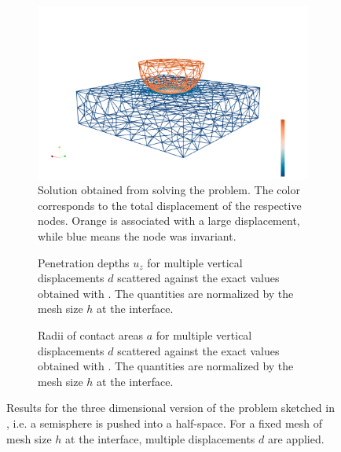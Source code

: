 \documentclass[11pt, a4paper]{article}
\begin{document}
\begin{figure}[H]
\begin{subfigure}[t]{\textwidth}
\centering
    \includegraphics[scale=0.4, trim={5cm 3cm 6cm 3cm},clip]{figures/mesh3d.png}
    \caption{Solution obtained from solving the problem. The color corresponds to the total displacement of the respective nodes. Orange is associated with a large displacement, while blue means the node was invariant.}
    \label{fig:contact3d-plane-sphere}
\end{subfigure}
\begin{subfigure}[t]{.49\textwidth}
    
    \caption{Penetration depths $u_z$ for multiple vertical displacements $d$ scattered against the exact values obtained with . The quantities are normalized by the mesh size $h$ at the interface.}
    \label{fig:normal-displacements-3d}
\end{subfigure}
\begin{subfigure}[t]{.49\textwidth}
     
     \caption{Radii of contact areas $a$ for multiple vertical displacements $d$ scattered against the exact values obtained with . The quantities are normalized by the mesh size $h$ at the interface.}
     \label{fig:contact-radius-3d}
\end{subfigure}
\caption{Results for the three dimensional version of the problem sketched in , i.e. a semisphere is pushed into a half-space. For a fixed mesh of mesh size $h$ at the interface, multiple displacements $d$ are applied.}
\label{fig:contact-plane-sphere}
\end{figure}
\end{document}
